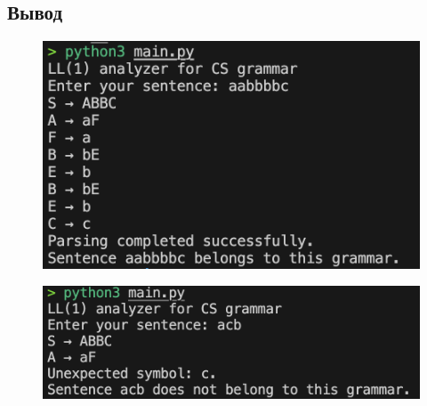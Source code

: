 \documentclass[12pt,onecolumn]{article}
\begin{document}
\subsection*{Вывод}
\begin{figure}[H]
    \includegraphics[width=\textwidth]{image/out1.png}
\end{figure}
\begin{figure}[H]
    \includegraphics[width=\textwidth]{image/out2.png}
\end{figure}
\end{document}
